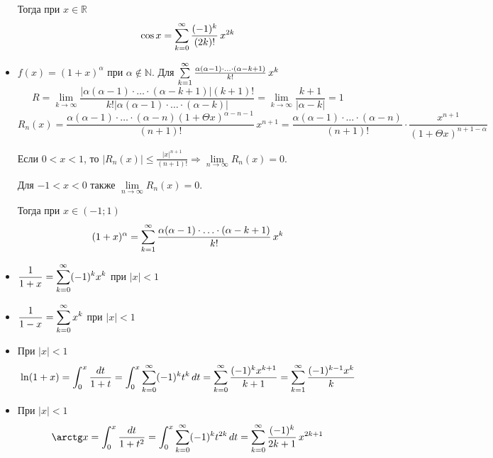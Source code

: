 \begin{itemize}
	Тогда при $x \in \mathbb R$
	\begin{equation*}
	\cos x = \series[0] \frac{(-1)^k}{(2k)!}\,x^{2k}
	\end{equation*}
	
	\item $f(x) = (1 + x)^\alpha$ при $\alpha \notin \mathbb N$.
	Для $\series \frac{\alpha (\alpha - 1) \cdot \ldots \cdot (\alpha - k + 1)}{k!}\,x^k$
	\begin{equation*}
	R = \lim_{k \to \infty} \frac
	{|\alpha (\alpha - 1) \cdot \ldots \cdot (\alpha - k + 1)| (k + 1)!}
	{k! |\alpha (\alpha - 1) \cdot \ldots \cdot (\alpha - k)|} =
	\lim_{k \to \infty} \frac{k + 1}{|\alpha - k|} = 1
	\end{equation*}
	\begin{equation*}
	R_n(x) = \frac{\alpha (\alpha - 1) \cdot \ldots \cdot (\alpha - n) (1 + \Theta x)^{\alpha-n-1}}{(n + 1)!}\,x^{n+1} =
	\frac{\alpha (\alpha - 1) \cdot \ldots \cdot (\alpha - n)}{(n + 1)!} \cdot
	\frac{x^{n+1}}{(1 + \Theta x)^{n+1-\alpha}}
	\end{equation*}
	
	Если $0 < x < 1$, то $|R_n(x)| \leqslant \frac{|x|^{n+1}}{(n + 1)!} \Rightarrow \lim\limits_{n \to \infty} R_n(x) = 0$.
	
	Для $-1 < x < 0$ также $\lim\limits_{n \to \infty} R_n(x) = 0$.
	
	Тогда при $x \in (-1; 1)$
	\begin{equation*}
	(1 + x)^\alpha = \series \frac{\alpha (\alpha - 1) \cdot \ldots \cdot (\alpha - k + 1)}{k!}\,x^k
	\end{equation*}
	
	\item $\displaystyle \frac1{1 + x} = \series[0] (-1)^k x^k$ при $|x| < 1$
	
	\item $\displaystyle \frac1{1 - x} = \series[0] x^k$ при $|x| < 1$
	
	\item При $|x| < 1$
	\begin{equation*}
	\ln (1 + x) =
	\int_0^x \frac{dt}{1 + t} =
	\int_0^x \series[0] (-1)^k t^k\,dt =
	\series[0] \frac{(-1)^k x^{k+1}}{k + 1} =
	\series \frac{(-1)^{k-1} x^k}{k}
	\end{equation*}
	
	\item При $|x| < 1$
	\begin{equation*}
	\arctg x =
	\int_0^x \frac{dt}{1 + t^2} =
	\int_0^x \series[0] (-1)^k t^{2k}\,dt =
	\series[0] \frac{(-1)^k}{2k + 1}\,x^{2k+1}
	\end{equation*}
\end{itemize}

